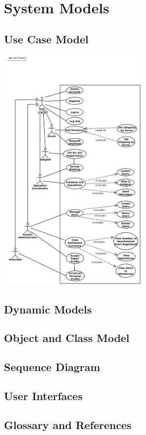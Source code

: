 \documentclass[a4paper,12pt]{report}
\begin{document}
	\chapter{System Models}
	\section{Use Case Model}
		\includegraphics[width=216pt,height=351pt]{use_case_diagram.png} %
	\section{Dynamic Models}
	\section{Object and Class Model}
	\section{Sequence Diagram}
	\section{User Interfaces}
	\section{Glossary and References}
\end{document}
